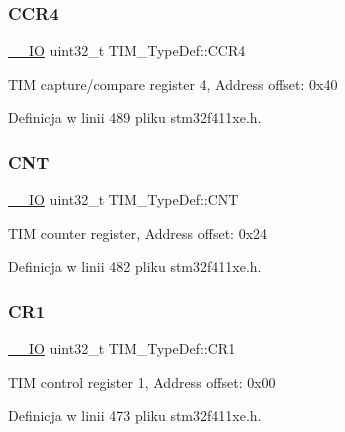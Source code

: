 \subsubsection{\texorpdfstring{C\+C\+R4}{CCR4}}
{\footnotesize\ttfamily \hyperlink{core__sc300_8h_aec43007d9998a0a0e01faede4133d6be}{\+\_\+\+\_\+\+IO} uint32\+\_\+t T\+I\+M\+\_\+\+Type\+Def\+::\+C\+C\+R4}

T\+IM capture/compare register 4, Address offset\+: 0x40 

Definicja w linii 489 pliku stm32f411xe.\+h.

\mbox{\label{struct_t_i_m___type_def_a6fdd2a7fb88d28670b472aaac0d9d262}} 
\subsubsection{\texorpdfstring{C\+NT}{CNT}}
{\footnotesize\ttfamily \hyperlink{core__sc300_8h_aec43007d9998a0a0e01faede4133d6be}{\+\_\+\+\_\+\+IO} uint32\+\_\+t T\+I\+M\+\_\+\+Type\+Def\+::\+C\+NT}

T\+IM counter register, Address offset\+: 0x24 

Definicja w linii 482 pliku stm32f411xe.\+h.

\mbox{\label{struct_t_i_m___type_def_a9dafc8b03e8497203a8bb395db865328}} 
\subsubsection{\texorpdfstring{C\+R1}{CR1}}
{\footnotesize\ttfamily \hyperlink{core__sc300_8h_aec43007d9998a0a0e01faede4133d6be}{\+\_\+\+\_\+\+IO} uint32\+\_\+t T\+I\+M\+\_\+\+Type\+Def\+::\+C\+R1}

T\+IM control register 1, Address offset\+: 0x00 

Definicja w linii 473 pliku stm32f411xe.\+h.

\mbox{\label{struct_t_i_m___type_def_a6b1ae85138ed91686bf63699c61ef835}} 
